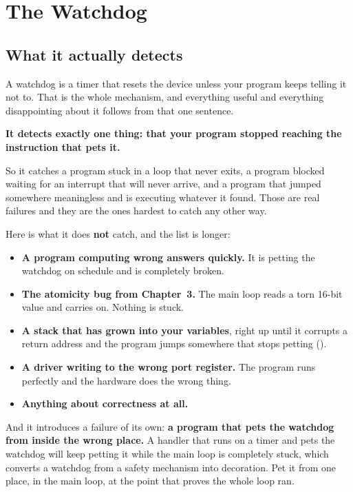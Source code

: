 
\section{The Watchdog}
\label{c6:sec:watchdog}

\subsection{What it actually detects}
\label{c6:sec:detects}
A watchdog is a timer that resets the device unless your program keeps telling it not to. That is
the whole mechanism, and everything useful and everything disappointing about it follows from
that one sentence.

\textbf{It detects exactly one thing: that your program stopped reaching the instruction that pets
it.}

So it catches a program stuck in a loop that never exits, a program blocked waiting for an
interrupt that will never arrive, and a program that jumped somewhere meaningless and is executing
whatever it found. Those are real failures and they are the ones hardest to catch any other way.

Here is what it does \textbf{not} catch, and the list is longer:
\begin{itemize}
  \item \textbf{A program computing wrong answers quickly.} It is petting the watchdog on schedule
    and is completely broken.
  \item \textbf{The atomicity bug from Chapter~3.} The main loop reads a torn 16-bit value and
    carries on. Nothing is stuck.
  \item \textbf{A stack that has grown into your variables}, right up until it corrupts a return
    address and the program jumps somewhere that stops petting ().
  \item \textbf{A driver writing to the wrong port register.} The program runs perfectly and the
    hardware does the wrong thing.
  \item \textbf{Anything about correctness at all.}
\end{itemize}

And it introduces a failure of its own: \textbf{a program that pets the watchdog from inside the
wrong place.} A handler that runs on a timer and pets the watchdog will keep petting it while the
main loop is completely stuck, which converts a watchdog from a safety mechanism into decoration.
Pet it from one place, in the main loop, at the point that proves the whole loop ran.

